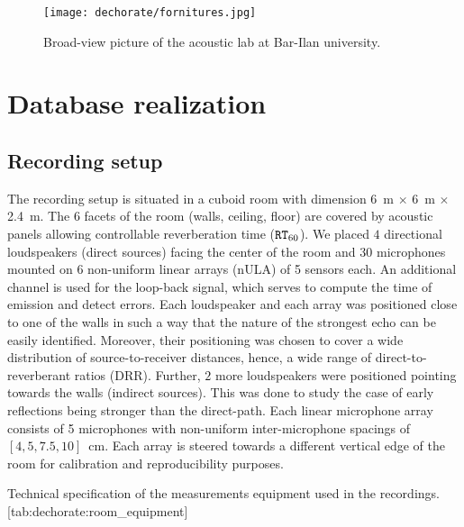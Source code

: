 \begin{figure}[t]
    \begin{fullwidth}
        \centering
        \texttt{[image: dechorate/fornitures.jpg]}
        \caption{Broad-view picture of the acoustic lab at Bar-Ilan university.}
        \label{fig:dechorate:room}
    \end{fullwidth}
\end{figure}


\section{Database realization}
\subsection{Recording setup}
The recording setup is situated in a cuboid room with dimension 6~m $\times$ 6~m $\times$ 2.4~m.
The 6 facets of the room (walls, ceiling, floor) are covered by acoustic panels allowing controllable reverberation time ($\mathtt{RT}_{60}$).
We placed $4$ directional loudspeakers (direct sources) facing the center of the room and $30$ microphones mounted on 6 non-uniform linear arrays (nULA) of 5 sensors each.
An additional channel is used for the loop-back signal, which serves to compute the time of emission and detect errors.
Each loudspeaker and each array was positioned close to one of the walls in such a way that the nature of the strongest echo can be easily identified.
Moreover, their positioning was chosen to cover a wide distribution of source-to-receiver distances, hence, a wide range of direct-to-reverberant ratios (\ac{DRR}).
Further, $2$ more loudspeakers were positioned pointing towards the walls (indirect sources).
This was done to study the case of early reflections being stronger than the direct-path.
Each linear microphone array consists of 5 microphones with non-uniform inter-microphone spacings of $[4, 5, 7.5, 10]$~cm.
Each array is steered towards a different vertical edge of the room for calibration and reproducibility purposes.


\begin{table}[h]
    \begin{sidecaption}[]{
        Technical specification of the measurements equipment used in the recordings.
        }[tab:dechorate:room_equipment]
        \centering
        \small
        
    \end{sidecaption}
\end{table}

